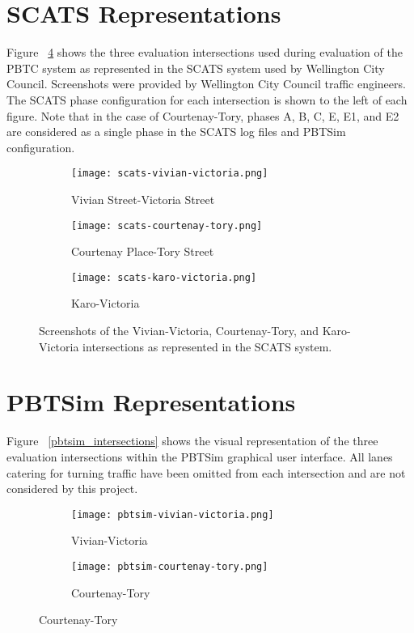 \begin{appendices}
\section{SCATS Representations} 

Figure ~\ref{scats_intersections} shows the three evaluation intersections used during evaluation of the PBTC system as represented in the SCATS system used by Wellington City Council. Screenshots were provided by Wellington City Council traffic engineers. The SCATS phase configuration for each intersection is shown to the left of each figure. Note that in the case of Courtenay-Tory, phases A, B, C, E, E1, and E2 are considered as a single phase in the SCATS log files and PBTSim configuration.


\begin{figure}[]
\centering
\begin{subfigure}{.5\textwidth}
  \centering
  \texttt{[image: scats-vivian-victoria.png]}
  \caption{Vivian Street-Victoria Street}
  \label{fig:sub1}
\end{subfigure}%
\begin{subfigure}{.5\textwidth}
  \centering
  \texttt{[image: scats-courtenay-tory.png]}
  \caption{Courtenay Place-Tory Street}
  \label{fig:sub2}
\end{subfigure}

\vspace{1cm}

\begin{subfigure}{.5\textwidth}
  \centering
  \texttt{[image: scats-karo-victoria.png]}
  \caption{Karo-Victoria}
  \label{fig:sub1}
\end{subfigure}%
\caption{ Screenshots of the Vivian-Victoria, Courtenay-Tory, and Karo-Victoria intersections as represented in the SCATS system. }
\label{scats_intersections}
\end{figure}

\section{PBTSim Representations}

Figure ~\ref{pbtsim_intersections} shows the visual representation of the three evaluation intersections within the PBTSim graphical user interface. All lanes catering for turning traffic have been omitted from each intersection and are not considered by this project. 

\begin{figure}[]
\centering
\begin{subfigure}{.5\textwidth}
  \centering
  \texttt{[image: pbtsim-vivian-victoria.png]}
  \caption{Vivian-Victoria}
  \label{fig:sub1}
\end{subfigure}%
\begin{subfigure}{.5\textwidth}
  \centering
  \texttt{[image: pbtsim-courtenay-tory.png]}
  \caption{Courtenay-Tory}
  \label{fig:sub2}
\end{subfigure}


\end{figure}
\end{appendices}
